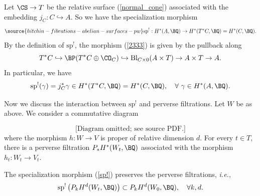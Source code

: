 \begin{example}
\notready\label{example1}
Let $\CS \to T$ be the relative surface (\ref{normal_cone}) associated with the embedding $j_C: C \hookrightarrow A$. So we have the specialization morphism
\begin{equation}\label{2333}
\source{hitchin-fibrations-abelian-surfaces-pw}
\mathrm{sp}^!: H^*(A, \BQ) \to H^*(T^*C, \BQ) = H^*(C, \BQ).
\end{equation}
By the definition of $\mathrm{sp}^!$, the morphism (\ref{2333}) is given by the pullback along
\[
T^*C  \hookrightarrow \BP(T^*C \oplus \CO_C) \hookrightarrow \mathrm{Bl}_{C\times 0}(A \times T) \to A\times T \to A.
\]
In particular, we have
\[
\mathrm{sp}^!(\gamma)  = j_C^* \gamma \in H^*(T^*C, \BQ) = H^*(C, \BQ),\quad \forall~ \gamma \in H^*(A, \BQ).
\]
\end{example}

Now we discuss the interaction between $\mathrm{sp}^!$ and perverse filtrations. Let $W$ be as above. We consider a commutative diagram

\begin{equation*}
\text{[Diagram omitted; see source PDF.]}
\end{equation*}
where the morphism $h: W \to V$ is proper of relative dimension $d$. For every $t \in T$, there is a perverse filtration $P_*H^*(W_t, \BQ)$ associated with the morphism $h_t : W_t \to V_t$.

\begin{prop}
\notready\label{Prop3.1}
The specialization morphism (\ref{sp!}) preserves the perverse filtrations, \emph{i.e.},
\[
\mathrm{sp}^!\left( P_kH^d(W_t, \BQ ) \right) \subset P_k H^d(W_0, \BQ), \quad \forall k,d.
\]
\end{prop}

